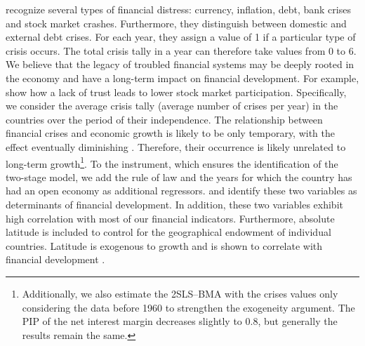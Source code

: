 \begin{refsection}

\textcite{ReinhartRogoff2008} recognize several types of financial distress: currency, inflation, debt, bank crises and stock market crashes. Furthermore, they distinguish between domestic and external debt crises. For each year, they assign a value of 1 if a particular type of crisis occurs. The total crisis tally in a year can therefore take values from 0 to 6. We believe that the legacy of troubled financial systems may be deeply rooted in the economy and have a long-term impact on financial development. For example, \textcite{Guiso2008} show how a lack of trust leads to lower stock market participation. Specifically, we consider the average crisis tally (average number of crises per year) in the countries over the period of their independence. The relationship between financial crises and economic growth is likely to be only temporary, with the effect eventually diminishing \parencite{Ranciereetal2006}. Therefore, their occurrence is likely unrelated to long-term growth\footnote{Additionally, we also estimate the 2SLS--BMA with the crises values only considering the data before 1960 to strengthen the exogeneity argument. The \ac{PIP} of the net interest margin decreases slightly to 0.8, but generally the results remain the same.}. To the instrument, which ensures the identification of the two-stage model, we add the rule of law and the years for which the country has had an open economy as additional regressors. \textcite{RajanZingales2003} and \textcite{Baltagietal2009} identify these two variables as determinants of financial development. In addition, these two variables exhibit high correlation with most of our financial indicators. Furthermore, absolute latitude is included to control for the geographical endowment of individual countries. Latitude is exogenous to growth and is shown to correlate with financial development \parencite{Becketal2002, Becketal2003}. 


\end{refsection}
